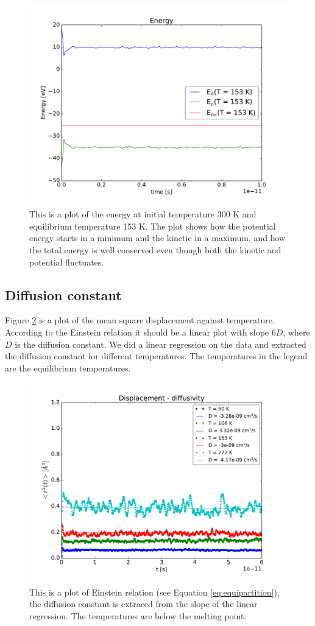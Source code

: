 \begin{figure}[H]
\center
\includegraphics[width=0.7\linewidth]{../figures/energy}\caption{This is a plot of the energy at initial temperature 300 K and equilibrium temperature 153 K. The plot shows how the potential energy starts in a minimum and the kinetic in a maximum, and how the total energy is well conserved even though both the kinetic and potential fluctuates.}\label{fig:energy}
\end{figure}

\subsection{Diffusion constant}

Figure \ref{fig:below_melting} is a plot of the mean square displacement against temperature. According to the Einstein relation it should be a linear plot with slope $6D$, where $D$ is the diffusion constant. We did a linear regression on the data and extracted the diffusion constant for different temperatures. The temperatures in the legend are the equilibrium temperatures.


\begin{figure}[H]
\center
\includegraphics[width=0.7\linewidth]{../figures/below_melting}\caption{This is a plot of Einstein relation (see Equation \ref{eq:equipartition}), the diffusion constant is extraced from the slope of the linear regression. The temperatures are below the melting point.}\label{fig:below_melting}
\end{figure}

